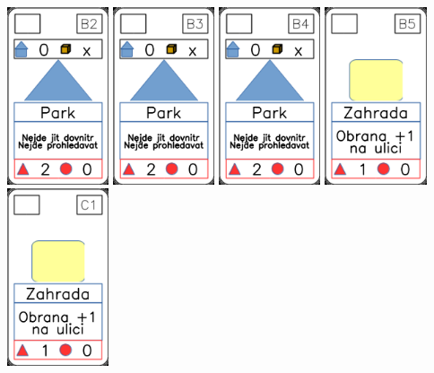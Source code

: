\documentclass[a4paper]{article}
\begin{document}
	\includegraphics[width=3.0cm]{img-3_21}
	\includegraphics[width=3.0cm]{img-3_22}
	\includegraphics[width=3.0cm]{img-3_23}
	\includegraphics[width=3.0cm]{img-3_24}
	\includegraphics[width=3.0cm]{img-3_25}
\end{document}
